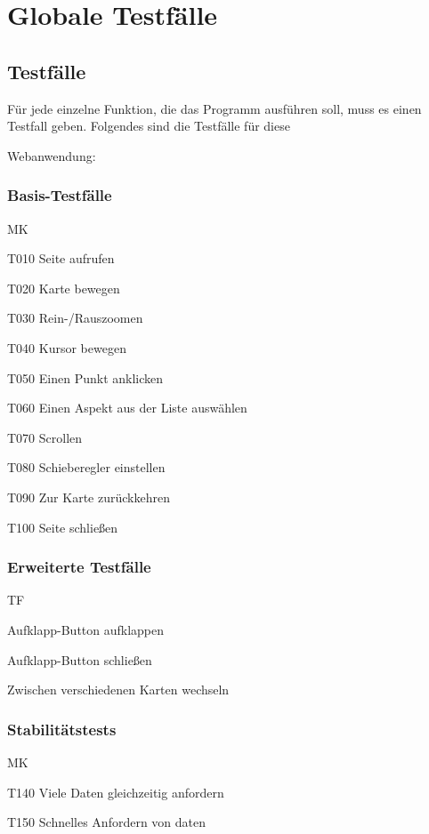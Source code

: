 \section{Globale Testfälle}
\subsection{Testfälle}
\setcounter{counter}{10}

Für jede einzelne Funktion, die das Programm ausführen soll, muss es einen Testfall geben. Folgendes sind die Testfälle für diese 

Webanwendung:
\subsubsection{Basis-Testfälle}
\begin{Kriterien}{MK}

	\item[T010] Seite aufrufen

	\item[T020] Karte bewegen
	
	
	\item[T030] Rein-/Rauszoomen
	
	\item[T040] Kursor bewegen
	
	\item[T050] Einen Punkt anklicken
	
	\item[T060] Einen Aspekt aus der Liste auswählen
	
	\item[T070] Scrollen
	
	\item[T080] Schieberegler einstellen
	
	\item[T090] Zur Karte zurückkehren
	
	\item[T100] Seite schließen
\end{Kriterien}
\subsubsection{Erweiterte Testfälle}
\begin{Kriterien}{TF}

	\item Aufklapp-Button aufklappen

	\item Aufklapp-Button schließen
	
	\item Zwischen verschiedenen Karten wechseln
	
\end{Kriterien}
\subsubsection{Stabilitätstests}
\begin{Kriterien}{MK}

	\item[T140] Viele Daten gleichzeitig anfordern

	\item[T150] Schnelles Anfordern von daten
	
\end{Kriterien}
